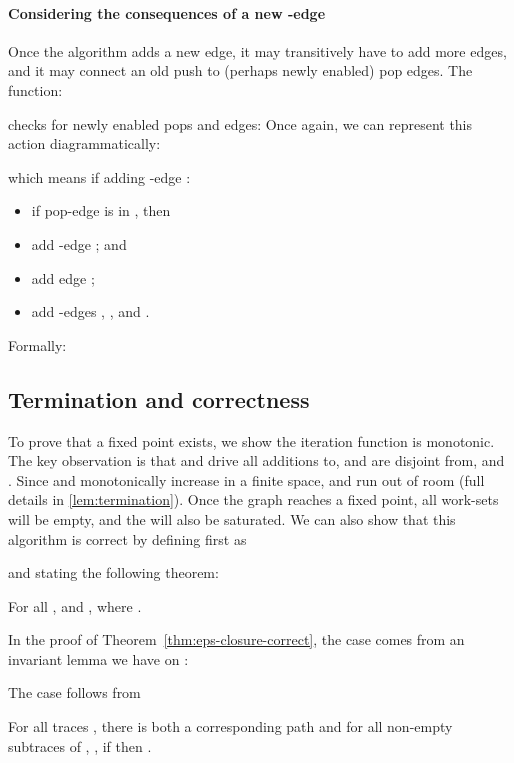  
\paragraph{Considering the consequences of a new -edge}
Once the algorithm adds a new \ecg{} edge, it may transitively
have to add more \ecg{} edges, and it may connect an old push to
(perhaps newly enabled) pop edges.
The  function:

checks for newly enabled pops and \ecg{} edges:
Once again, we can represent this action diagrammatically:

which means if adding -edge :
\begin{itemize}
  \item[] if pop-edge  is in , then
  \item[] \hspace{2em} add -edge ; and
  \item[] \hspace{2em} add edge ; 
  \item[] add -edges ,
    , and
    .
\end{itemize}
Formally:






\subsection{Termination and correctness}
To prove that a fixed point exists, we show the iteration function is monotonic.
The key observation is that  and  drive all additions to, and are disjoint from,  and .
Since  and  monotonically increase in a finite space,  and  run out of room (full details in \autoref{lem:termination}).
Once the graph reaches a fixed point, all work-sets will be empty, and the \ecg{} will also be saturated.
We can also show that this algorithm is correct by defining first 
 as


and stating the following theorem:

\begin{theorem}\label{thm:eps-closure-correct}
  For all ,  and ,
  where .
\end{theorem}
In the proof of Theorem~\ref{thm:eps-closure-correct}, the 
case comes from an invariant lemma we have on :

\begin{lemma}
  
\end{lemma}
The  case follows from
\begin{lemma}
  For all traces ,
  there is both a corresponding path  and
  for all non-empty subtraces of , , if  then .
\end{lemma}

